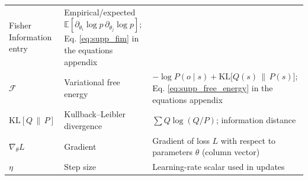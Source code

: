 \documentclass[
  10pt,
]{article}
\begin{document}
\begin{longtable}[]{@{}lll@{}}
\begin{minipage}[t]{0.30\columnwidth}
Fisher Information entry\strut
\end{minipage} & \begin{minipage}[t]{0.30\columnwidth}\raggedright
Empirical/expected
\(\mathbb{E}[\partial_{\theta_i}\log p\,\partial_{\theta_j}\log p]\);
Eq. \eqref{eq:supp_fim} in the equations appendix\strut
\end{minipage}\tabularnewline
\begin{minipage}[t]{0.30\columnwidth}\raggedright
\(\mathcal{F}\)\strut
\end{minipage} & \begin{minipage}[t]{0.30\columnwidth}\raggedright
Variational free energy\strut
\end{minipage} & \begin{minipage}[t]{0.30\columnwidth}\raggedright
\(-\log P(o\mid s) + \mathrm{KL}\big[Q(s)\,\|\,P(s)\big]\); Eq.
\eqref{eq:supp_free_energy} in the equations appendix\strut
\end{minipage}\tabularnewline
\begin{minipage}[t]{0.30\columnwidth}\raggedright
\(\mathrm{KL}[Q\,\|\,P]\)\strut
\end{minipage} & \begin{minipage}[t]{0.30\columnwidth}\raggedright
Kullback--Leibler divergence\strut
\end{minipage} & \begin{minipage}[t]{0.30\columnwidth}\raggedright
\(\sum Q\log(Q/P)\); information distance\strut
\end{minipage}\tabularnewline
\begin{minipage}[t]{0.30\columnwidth}\raggedright
\(\nabla_{\theta}L\)\strut
\end{minipage} & \begin{minipage}[t]{0.30\columnwidth}\raggedright
Gradient\strut
\end{minipage} & \begin{minipage}[t]{0.30\columnwidth}\raggedright
Gradient of loss \(L\) with respect to parameters \(\theta\) (column
vector)\strut
\end{minipage}\tabularnewline
\begin{minipage}[t]{0.30\columnwidth}\raggedright
\(\eta\)\strut
\end{minipage} & \begin{minipage}[t]{0.30\columnwidth}\raggedright
Step size\strut
\end{minipage} & \begin{minipage}[t]{0.30\columnwidth}\raggedright
Learning-rate scalar used in updates\strut

\end{minipage}
\end{longtable}
\end{document}
